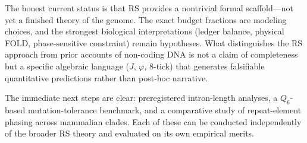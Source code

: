 \documentclass[11pt,a4paper]{article}
\newcommand{\Jcost}{J}
\newcommand{\ph}{\varphi}
\newcommand{\Qsix}{\ensuremath{Q_6}}
\begin{document}
The honest current status is that RS provides a nontrivial formal scaffold---not yet a finished theory of the genome. The exact budget fractions are modeling choices, and the strongest biological interpretations (ledger balance, physical FOLD, phase-sensitive constraint) remain hypotheses. What distinguishes the RS approach from prior accounts of non-coding DNA is not a claim of completeness but a specific algebraic language ($\Jcost$, $\ph$, 8-tick) that generates falsifiable quantitative predictions rather than post-hoc narrative.

The immediate next steps are clear: preregistered intron-length analyses, a \Qsix{}-based mutation-tolerance benchmark, and a comparative study of repeat-element phasing across mammalian clades. Each of these can be conducted independently of the broader RS theory and evaluated on its own empirical merits.
\end{document}
